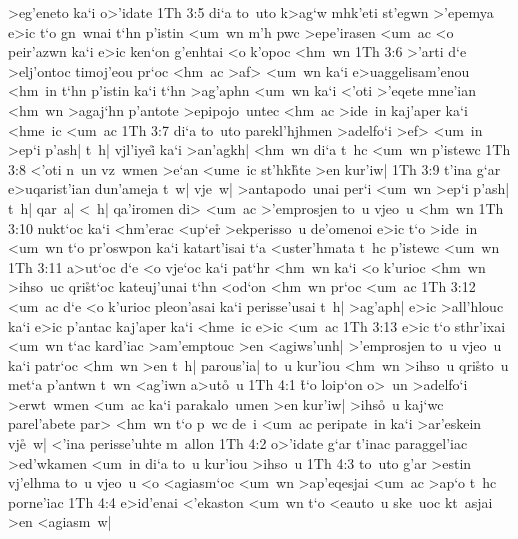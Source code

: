 >eg'eneto
ka`i
o>'idate\bibvsend
\vs 1Th 3:5
di`a
to~uto
k>ag`w
mhk'eti
st'egwn
>'epemya
e>ic
t`o
gn~wnai
t`hn
p'istin
<um~wn
m'h
pwc
>epe'irasen
<um~ac
<o
peir'azwn
ka`i
e>ic
ken`on
g'enhtai
<o
k'opoc
<hm~wn\bibvsend
\vs 1Th 3:6
>'arti
d`e
>elj'ontoc
timoj'eou
pr`oc
<hm~ac
>af>
<um~wn
ka`i
e>uaggelisam'enou
<hm~in
t`hn
p'istin
ka`i
t`hn
>ag'aphn
<um~wn
ka`i
<'oti
>'eqete
mne'ian
<hm~wn
>agaj`hn
p'antote
>epipojo~untec
<hm~ac
>ide~in
kaj'aper
ka`i
<hme~ic
<um~ac\bibvsend
\vs 1Th 3:7
di`a
to~uto
parekl'hjhmen
>adelfo`i
>ef>
<um~in
>ep`i
p'ash|
t~h|
vjl'iyei\r{}
ka`i
>an'agkh|
<hm~wn
di`a
t~hc
<um~wn
p'istewc\bibvsend
\vs 1Th 3:8
<'oti
n~un
vz~wmen
>e`an
<ume~ic
st'hk\r{h}te
>en
kur'iw|\bibvsend
\vs 1Th 3:9
t'ina
g`ar
e>uqarist'ian
dun'ameja
t~w|
vje~w|
>antapodo~unai
per`i
<um~wn
>ep`i
p'ash|
t~h|
qar~a|
<~h|
qa'iromen
di>
<um~ac
>'emprosjen
to~u
vjeo~u
<hm~wn\bibvsend
\vs 1Th 3:10
nukt`oc
ka`i
<hm'erac
<up`er\r{}
>ekperisso~u
de'omenoi
e>ic
t`o
>ide~in
<um~wn
t`o
pr'oswpon
ka`i
katart'isai
t`a
<uster'hmata
t~hc
p'istewc
<um~wn\bibvsend
\vs 1Th 3:11
a>ut`oc
d`e
<o
vje`oc
ka`i
pat`hr
<hm~wn
ka`i
<o
k'urioc
<hm~wn
>ihso~uc
qri\r{s}t`oc
kateuj'unai
t`hn
<od`on
<hm~wn
pr`oc
<um~ac\bibvsend
\vs 1Th 3:12
<um~ac
d`e
<o
k'urioc
pleon'asai
ka`i
perisse'usai
t~h|
>ag'aph|
e>ic
>all'hlouc
ka`i
e>ic
p'antac
kaj'aper
ka`i
<hme~ic
e>ic
<um~ac\bibvsend
\vs 1Th 3:13
e>ic
t`o
sthr'ixai
<um~wn
t`ac
kard'iac
>am'emptouc
>en
<agiws'unh|
>'emprosjen
to~u
vjeo~u
ka`i
patr`oc
<hm~wn
>en
t~h|
parous'ia|
to~u
kur'iou
<hm~wn
>ihso~u
qri\r{s}to~u
met`a
p'antwn
t~wn
<ag'iwn
a>ut\r{o}~u\bibvsend
{}
\vs 1Th 4:1
\r{t}`o
loip`on
o>~un
>adelfo`i
>erwt~wmen
<um~ac
ka`i
parakalo~umen
>en
kur'iw|
>ihs\r{o}~u
kaj`wc
parel'abete
par>
<hm~wn
t`o
p~wc
de~i
<um~ac
peripate~in
ka`i
>ar'eskein
vj\r{e}~w|
<'ina
perisse'uhte
m~allon\bibvsend
\vs 1Th 4:2
o>'idate
g`ar
t'inac
paraggel'iac
>ed'wkamen
<um~in
di`a
to~u
kur'iou
>ihso~u\bibvsend
\vs 1Th 4:3
to~uto
g'ar
>estin
vj'elhma
to~u
vjeo~u
<o
<agiasm`oc
<um~wn
>ap'eqesjai
<um~ac
>ap`o
t~hc
porne'iac\bibvsend
\vs 1Th 4:4
e>id'enai
<'ekaston
<um~wn
t`o
<eauto~u
ske~uoc
kt~asjai
>en
<agiasm~w|
